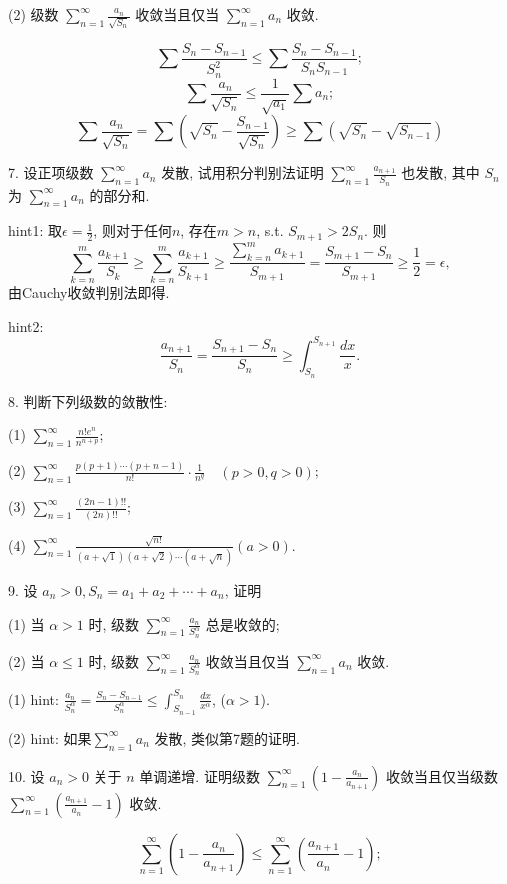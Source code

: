 (2) 级数 $\sum_{n=1}^{\infty}\frac{a_{n}}{\sqrt{S_{n}}}$ 收敛当且仅当 $\sum_{n=1}^{\infty}a_{n}$
收敛. 

\[
\sum\frac{S_{n}-S_{n-1}}{S_{n}^{2}}\le\sum\frac{S_{n}-S_{n-1}}{S_{n}S_{n-1}};
\]
\[
\sum\frac{a_{n}}{\sqrt{S_{n}}}\le\frac{1}{\sqrt{a_{1}}}\sum a_{n};
\]
\[
\sum\frac{a_{n}}{\sqrt{S_{n}}}=\sum\left(\sqrt{S_{n}}-\frac{S_{n-1}}{\sqrt{S_{n}}}\right)\ge\sum\left(\sqrt{S_{n}}-\sqrt{S_{n-1}}\right)
\]

7. 设正项级数 $\sum_{n=1}^{\infty}a_{n}$ 发散, 试用积分判别法证明 $\sum_{n=1}^{\infty}\frac{a_{n+1}}{S_{n}}$
也发散, 其中 $S_{n}$ 为 $\sum_{n=1}^{\infty}a_{n}$ 的部分和. 

hint1: 取$\epsilon=\frac{1}{2}$, 则对于任何$n$, 存在$m>n$, s.t. $S_{m+1}>2S_{n}$.
则
\[
\sum_{k=n}^{m}\frac{a_{k+1}}{S_{k}}\ge\sum_{k=n}^{m}\frac{a_{k+1}}{S_{k+1}}\ge\frac{\sum_{k=n}^{m}a_{k+1}}{S_{m+1}}=\frac{S_{m+1}-S_{n}}{S_{m+1}}\ge\frac{1}{2}=\epsilon,
\]
由Cauchy收敛判别法即得.

hint2: 
\[
\frac{a_{n+1}}{S_{n}}=\frac{S_{n+1}-S_{n}}{S_{n}}\ge\int_{S_{n}}^{S_{n+1}}\frac{dx}{x}.
\]

8. 判断下列级数的敛散性: 

(1) $\sum_{n=1}^{\infty}\frac{n!e^{n}}{n^{n+p}}$; 

(2) $\sum_{n=1}^{\infty}\frac{p(p+1)\cdots(p+n-1)}{n!}\cdot\frac{1}{n^{q}}\quad(p>0,q>0)$; 

(3) $\sum_{n=1}^{\infty}\frac{(2n-1)!!}{(2n)!!}$; 

(4) $\sum_{n=1}^{\infty}\frac{\sqrt{n!}}{(a+\sqrt{1})(a+\sqrt{2})\cdots(a+\sqrt{n})}(a>0)$. 

9. 设 $a_{n}>0,S_{n}=a_{1}+a_{2}+\cdots+a_{n}$, 证明 

(1) 当 $\alpha>1$ 时, 级数 $\sum_{n=1}^{\infty}\frac{a_{n}}{S_{n}^{\alpha}}$
总是收敛的; 

(2) 当 $\alpha\leqslant1$ 时, 级数 $\sum_{n=1}^{\infty}\frac{a_{n}}{S_{n}^{\alpha}}$
收敛当且仅当 $\sum_{n=1}^{\infty}a_{n}$ 收敛.

(1) hint: $\frac{a_{n}}{S_{n}^{\alpha}}=\frac{S_{n}-S_{n-1}}{S_{n}^{\alpha}}\le\int_{S_{n-1}}^{S_{n}}\frac{dx}{x^{\alpha}}$,
($\alpha>1$).

(2) hint: 如果$\sum_{n=1}^{\infty}a_{n}$ 发散, 类似第7题的证明.

10. 设 $a_{n}>0$ 关于 $n$ 单调递增. 证明级数 $\sum_{n=1}^{\infty}\left(1-\frac{a_{n}}{a_{n+1}}\right)$
收敛当且仅当级数 $\sum_{n=1}^{\infty}\left(\frac{a_{n+1}}{a_{n}}-1\right)$
收敛. 

\[
\sum_{n=1}^{\infty}\left(1-\frac{a_{n}}{a_{n+1}}\right)\le\sum_{n=1}^{\infty}\left(\frac{a_{n+1}}{a_{n}}-1\right);
\]


